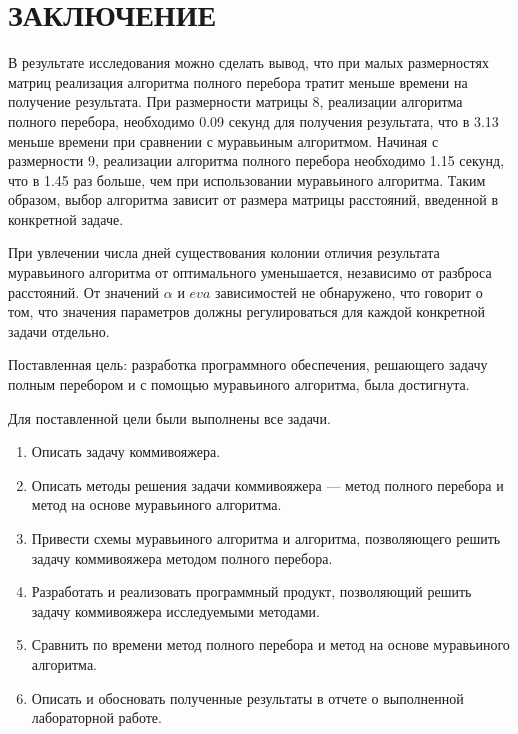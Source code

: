 \chapter*{\hfill{\centering  ЗАКЛЮЧЕНИЕ}\hfill}

В результате исследования можно сделать вывод, что при малых размерностях матриц реализация алгоритма полного перебора тратит меньше времени на получение результата.
При размерности матрицы 8, реализации алгоритма полного перебора, необходимо 0.09 секунд для получения результата, что в 3.13 меньше времени при сравнении с муравьиным алгоритмом.
Начиная с размерности 9, реализации алгоритма полного перебора необходимо 1.15 секунд, что в 1.45 раз больше, чем при использовании муравьиного алгоритма.
Таким образом, выбор алгоритма зависит от размера матрицы расстояний, введенной в конкретной задаче.

При увлечении числа дней существования колонии отличия результата муравьиного алгоритма от оптимального уменьшается, независимо от разброса расстояний. От значений $\alpha$ и $eva$ зависимостей не обнаружено, что говорит о том, что значения параметров должны регулироваться для каждой конкретной задачи отдельно. 

Поставленная цель: разработка программного обеспечения, решающего задачу полным перебором и с помощью муравьиного алгоритма, была достигнута.

Для поставленной цели были выполнены все задачи.
\begin{enumerate}
	\item Описать задачу коммивояжера.
	\item Описать методы решения задачи коммивояжера --- метод полного перебора и метод на основе муравьиного алгоритма.
	\item Привести схемы муравьиного алгоритма и алгоритма, позволяющего решить задачу коммивояжера методом полного перебора.
	\item Разработать и реализовать программный продукт, позволяющий решить задачу коммивояжера исследуемыми методами.
	\item Сравнить по времени метод полного перебора и метод на основе муравьиного алгоритма.
	\item Описать и обосновать полученные результаты в отчете о выполненной лабораторной работе.
\end{enumerate}